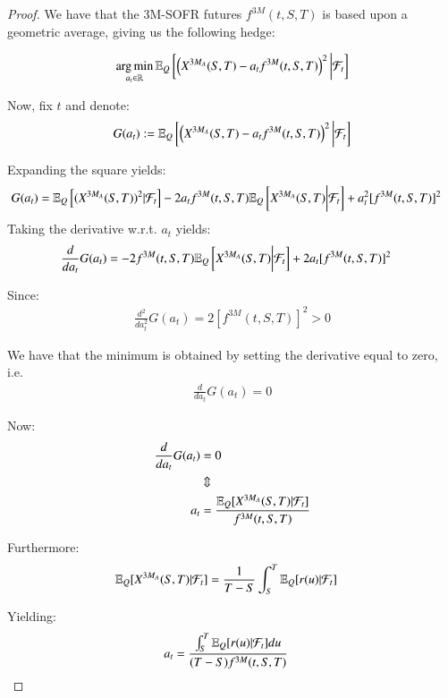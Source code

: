 \begin{proof}
    
We have that the 3M-SOFR futures $f^{3M}(t,S,T)$ is based upon a geometric average, giving us the following hedge:

\begin{align*}
\operatorname*{arg\,min}\limits_{a_{t} \in \mathbb{R}}\mathbb{E}_{Q}\left[
\left(
X^{3M_{A}}(S,T)-a_{t}f^{3M}(t,S,T)
\right)^{2}
\bigg{|}\mathcal{F}_{t}
\right]
\end{align*}

Now, fix $t$ and denote: 
\begin{align*}
G(a_{t}) :=\mathbb{E}_{Q}\left[
\left(X^{3M_{A}}(S,T)-a_{t}f^{3M}(t,S,T)
\right)^{2}
\bigg{|}\mathcal{F}_{t}
\right]    
\end{align*} 

Expanding the square yields:
\begin{align*}
G(a_{t}) &= \mathbb{E}_{Q}\left[(X^{3M_{A}}(S,T))^{2}|\mathcal{F}_{t}\right] -2a_{t}f^{3M}(t,S,T)\mathbb{E}_{Q}\left[X^{3M_{A}}(S,T)\bigg{|}\mathcal{F}_{t}\right] +
a_{t}^{2}[f^{3M}(t,S,T)]^{2}
\end{align*}
Taking the derivative w.r.t. $a_{t}$ yields: 
\begin{align*}
\frac{d}{da_{t}}G(a_{t}) &= -2f^{3M}(t,S,T)
\mathbb{E}_{Q}\left[X^{3M_{A}}(S,T)\bigg{|}\mathcal{F}_{t}\right] + 2a_{t}[f^{3M}(t,S,T)]^{2}  
\end{align*} 

\newpage 

Since: 
\begin{align*}
\frac{d^{2}}{da_{t}^{2}}G(a_{t}) = 2[f^{3M}(t,S,T)]^{2} > 0    
\end{align*}

We have that the minimum is obtained by setting the derivative equal to zero, i.e. 
\begin{align*}
\frac{d}{da_{t}}G(a_{t}) = 0    
\end{align*}

Now: 
\begin{align*}
\frac{d}{da_{t}}G(a_{t}) &= 0 \\
&\Updownarrow \\ 
a_{t} &= \frac{
\mathbb{E}_{Q}[X^{3M_{A}}(S,T)|\mathcal{F}_{t}]
}{
f^{3M}(t,S,T)
}
\end{align*}

Furthermore: 
\begin{align*}
\mathbb{E}_{Q}[X^{3M_{A}}(S,T)|\mathcal{F}_{t}] 
&= 
\frac{1}{T-S}\int_{S}^{T}\mathbb{E}_{Q}[r(u)|\mathcal{F}_{t}]
\end{align*}

Yielding: 
\begin{align*}
a_{t} &= \frac{
\int_{S}^{T}\mathbb{E}_{Q}[r(u)|\mathcal{F}_{t}]du
}{
(T-S)f^{3M}(t,S,T)
}    
\end{align*}
\end{proof}

